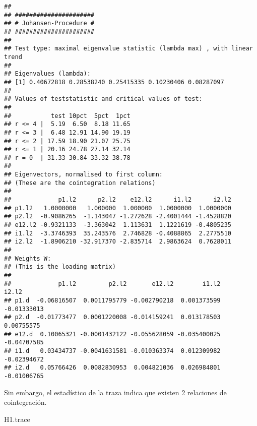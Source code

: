 \documentclass[]{book}
\newenvironment{Shaded}{\begin{snugshade}}{\end{snugshade}}
\newcommand{\NormalTok}[1]{#1}
\theoremstyle{definition}
\theoremstyle{definition}
\theoremstyle{definition}
\theoremstyle{remark}
\begin{document}
\begin{verbatim}
## 
## ###################### 
## # Johansen-Procedure # 
## ###################### 
## 
## Test type: maximal eigenvalue statistic (lambda max) , with linear trend 
## 
## Eigenvalues (lambda):
## [1] 0.40672818 0.28538240 0.25415335 0.10230406 0.08287097
## 
## Values of teststatistic and critical values of test:
## 
##           test 10pct  5pct  1pct
## r <= 4 |  5.19  6.50  8.18 11.65
## r <= 3 |  6.48 12.91 14.90 19.19
## r <= 2 | 17.59 18.90 21.07 25.75
## r <= 1 | 20.16 24.78 27.14 32.14
## r = 0  | 31.33 30.84 33.32 38.78
## 
## Eigenvectors, normalised to first column:
## (These are the cointegration relations)
## 
##             p1.l2      p2.l2    e12.l2      i1.l2      i2.l2
## p1.l2   1.0000000   1.000000  1.000000  1.0000000  1.0000000
## p2.l2  -0.9086265  -1.143047 -1.272628 -2.4001444 -1.4528820
## e12.l2 -0.9321133  -3.363042  1.113631  1.1221619 -0.4805235
## i1.l2  -3.3746393  35.243576  2.746828 -0.4088865  2.2775510
## i2.l2  -1.8906210 -32.917370 -2.835714  2.9863624  0.7628011
## 
## Weights W:
## (This is the loading matrix)
## 
##             p1.l2         p2.l2       e12.l2        i1.l2       i2.l2
## p1.d  -0.06816507  0.0011795779 -0.002790218  0.001373599 -0.01333013
## p2.d  -0.01773477  0.0001220008 -0.014159241  0.013178503  0.00755575
## e12.d  0.10065321 -0.0001432122 -0.055628059 -0.035400025 -0.04707585
## i1.d   0.03434737 -0.0041631581 -0.010363374  0.012309982 -0.02394672
## i2.d   0.05766426  0.0082830953  0.004821036  0.026984801 -0.01006765
\end{verbatim}

Sin embargo, el estadístico de la traza indica que existen 2 relaciones
de cointegración.

\begin{Shaded}
\begin{Highlighting}[]
\NormalTok{H1.trace}
\end{Highlighting}
\end{Shaded}
\end{document}
